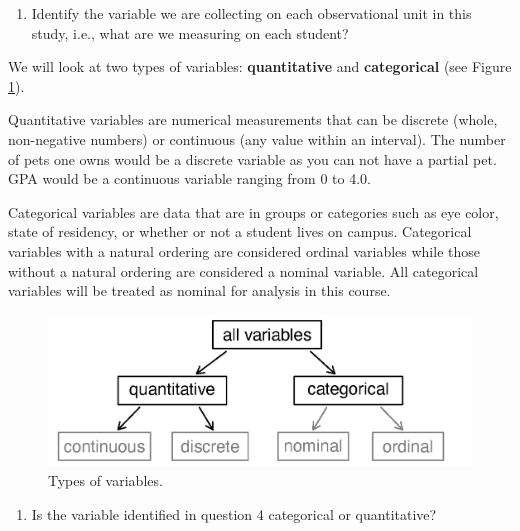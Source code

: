 \documentclass[
]{report}
\providecommand{\tightlist}{%
  \setlength{\itemsep}{0pt}\setlength{\parskip}{0pt}}
\begin{document}
\begin{enumerate}
\def\labelenumi{\arabic{enumi}.}
\setcounter{enumi}{3}
\tightlist
\item
  Identify the variable we are collecting on each observational unit in this study, i.e., what are we measuring on each student?
\end{enumerate}

\vspace{.8in}

We will look at two types of variables: \textbf{quantitative} and \textbf{categorical} (see Figure \ref{fig:types-of-variables}).

Quantitative variables are numerical measurements that can be discrete (whole, non-negative numbers) or continuous (any value within an interval). The number of pets one owns would be a discrete variable as you can not have a partial pet. GPA would be a continuous variable ranging from 0 to 4.0.

Categorical variables are data that are in groups or categories such as eye color, state of residency, or whether or not a student lives on campus. Categorical variables with a natural ordering are considered ordinal variables while those without a natural ordering are considered a nominal variable. All categorical variables will be treated as nominal for analysis in this course.

\begin{figure}

{\centering \includegraphics[width=0.6\linewidth]{images/variables} 

}

\caption{Types of variables.}\label{fig:types-of-variables}
\end{figure}

\begin{enumerate}
\def\labelenumi{\arabic{enumi}.}
\setcounter{enumi}{4}
\tightlist
\item
  Is the variable identified in question 4 categorical or quantitative?
\end{enumerate}

\vspace{0.3in}

\newpage
\end{document}
